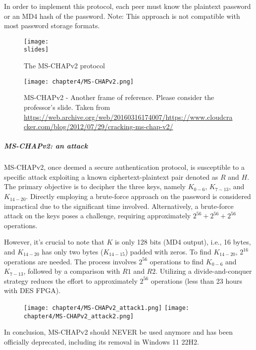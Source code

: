 In order to implement this protocol, each peer must know the plaintext password or an MD4 hash of the password. Note: This approach is not compatible with most password storage formats.


\begin{figure}[H]
    \centering
    \texttt{[image: \\slides]}
    \caption{The MS-CHAPv2 protocol}
\end{figure}

\begin{figure}[H]
    \centering
    \texttt{[image: chapter4/MS-CHAPv2.png]}
    \caption{MS-CHAPv2 - Another frame of reference. Please consider the professor's slide. Taken from\\ 
    \url{https://web.archive.org/web/20160316174007/https://www.cloudcracker.com/blog/2012/07/29/cracking-ms-chap-v2/}}
\end{figure}


\subparagraph{MS-CHAPv2: an attack}
MS-CHAPv2, once deemed a secure authentication protocol, is susceptible to a specific attack exploiting a known ciphertext-plaintext pair denoted as \(R\) and \(H\). The primary objective is to decipher the three keys, namely \(K_{0-6}\), \(K_{7-13}\), and \(K_{14-20}\). Directly employing a brute-force approach on the password is considered impractical due to the significant time involved. Alternatively, a brute-force attack on the keys poses a challenge, requiring approximately \(2^{56} + 2^{56} + 2^{56}\) operations.

However, it's crucial to note that \(K\) is only 128 bits (MD4 output), i.e., 16 bytes, and \(K_{14-20}\) has only two bytes (\(K_{14-15}\)) padded with zeros. To find \(K_{14-20}\), \(2^{16}\) operations are needed. The process involves \(2^{56}\) operations to find \(K_{0-6}\) and \(K_{7-13}\), followed by a comparison with \(R1\) and \(R2\). Utilizing a divide-and-conquer strategy reduces the effort to approximately \(2^{56}\) operations (less than 23 hours with DES FPGA).

\begin{figure}[H]
    \centering
    \texttt{[image: chapter4/MS-CHAPv2\_attack1.png]}
    \texttt{[image: chapter4/MS-CHAPv2\_attack2.png]}
\end{figure}

In conclusion, MS-CHAPv2 should NEVER be used anymore and has been officially deprecated, including its removal in Windows 11 22H2.
